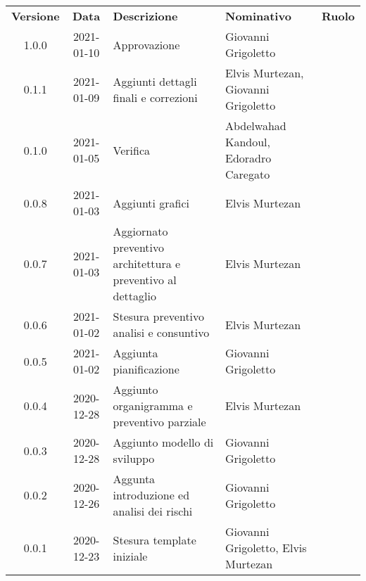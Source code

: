 {
    \renewcommand{\arraystretch}{1.5}
    \centering
    \begin{longtable}{ c c  C{3.5cm}  C{3.5cm}  c }
        \rowcolor{\primaryColor}
        \textcolor{\secondaryColor}{
        \textbf{Versione}}     & \textcolor{\secondaryColor}{\textbf{Data}}       & \textcolor{\secondaryColor}
        {\textbf{Descrizione}} & \textcolor{\secondaryColor}{\textbf{Nominativo}} & \textcolor{\secondaryColor}{\textbf{Ruolo}}                          \\


        1.0.0  & 
        2021-01-10  & 
        Approvazione & 
        Giovanni Grigoletto & 
        \responsabile{} \\

        0.1.1  & 
        2021-01-09 & 
        Aggiunti dettagli finali e correzioni & 
        Elvis Murtezan, Giovanni Grigoletto  & 
        \redattore{} \\

        0.1.0  & 
        2021-01-05 & 
        Verifica & 
        Abdelwahad Kandoul, Edoradro Caregato  & 
        \verificatore{} \\

        0.0.8  & 
        2021-01-03 & 
        Aggiunti grafici & 
        Elvis Murtezan  & 
        \redattore{} \\

        0.0.7  & 
        2021-01-03 & 
        Aggiornato preventivo architettura e preventivo al dettaglio & 
        Elvis Murtezan  & 
        \redattore{} \\

        0.0.6  & 
        2021-01-02 & 
        Stesura preventivo analisi e consuntivo & 
        Elvis Murtezan  & 
        \redattore{} \\

        0.0.5  & 
        2021-01-02 & 
        Aggiunta pianificazione & 
        Giovanni Grigoletto & 
        \redattore{} \\

        0.0.4  & 
        2020-12-28 & 
        Aggiunto organigramma e preventivo parziale & 
        Elvis Murtezan  & 
        \redattore{} \\

        0.0.3  & 
        2020-12-28 & 
        Aggiunto modello di sviluppo & 
        Giovanni Grigoletto & 
        \redattore{} \\
        
        0.0.2  & 
        2020-12-26 & 
        Aggunta introduzione ed analisi dei rischi & 
        Giovanni Grigoletto & 
        \redattore{} \\

        0.0.1  & 
        2020-12-23 & 
        Stesura template iniziale & 
        Giovanni Grigoletto, Elvis Murtezan & 
        \redattore{} \\
    \end{longtable}
}
